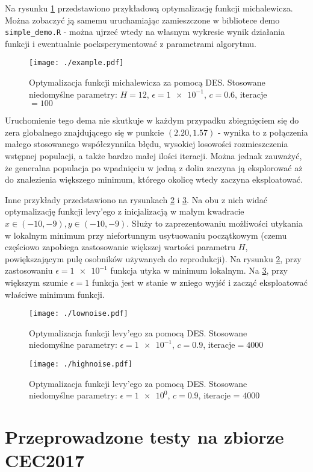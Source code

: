 Na rysunku \ref{R1} przedstawiono przykładową optymalizację funkcji michalewicza. Można zobaczyć ją samemu uruchamiając zamieszczone w bibliotece demo \verb|simple_demo.R| - można ujrzeć wtedy na własnym  wykresie wynik działania funkcji i ewentualnie poeksperymentować z parametrami algorytmu.

\begin{figure}
\texttt{[image: ./example.pdf]}
\caption{Optymalizacja funkcji michalewicza za pomocą DES. Stosowane niedomyślne parametry: $ H = 12 $, $ \epsilon = \num{1e-1} $, $ c = 0.6 $, iteracje$ =100 $}
\label{R1}
\end{figure}

Uruchomienie tego dema nie skutkuje w każdym przypadku zbiegnięciem się do zera globalnego znajdującego się w punkcie $ (2.20,1.57) $ - wynika to z połączenia małego stosowanego współczynnika błędu, wysokiej losowości rozmieszczenia wstępnej populacji, a także bardzo małej ilości iteracji. Można jednak zauważyć, że generalna populacja po wpadnięciu w jedną z dolin zaczyna ją eksplorować aż do znalezienia większego minimum, którego okolicę wtedy zaczyna eksploatować.

Inne przykłady przedstawiono na rysunkach \ref{R2} i \ref{R3}. Na obu z nich widać optymalizację funkcji levy'ego z inicjalizacją w małym kwadracie $ x \in (-10,-9), y\in (-10,-9) $. Służy to zaprezentowaniu możliwości utykania w lokalnym minimum przy niefortunnym usytuowaniu początkowym (czemu częściowo zapobiega zastosowanie większej wartości parametru $ H $, powiększającym pulę osobników używanych do reprodukcji). Na rysunku \ref{R2}, przy zastosowaniu $ \epsilon = \num{1e-1} $ funkcja utyka w minimum lokalnym. Na \ref{R3}, przy większym szumie $ \epsilon = \num{1} $ funkcja jest w stanie w zniego wyjść i zacząć eksploatować właściwe minimum funkcji.
 
\begin{figure}
	\texttt{[image: ./lownoise.pdf]}
	\caption{Optymalizacja funkcji levy'ego za pomocą DES. Stosowane niedomyślne parametry: $ \epsilon = \num{1e-1} $, $ c = 0.9 $, iteracje$ =4000 $}
	\label{R2}
\end{figure}


\begin{figure}
	\texttt{[image: ./highnoise.pdf]}
	\caption{Optymalizacja funkcji levy'ego za pomocą DES. Stosowane niedomyślne parametry: $ \epsilon = \num{1e0} $, $ c = 0.9 $, iteracje = $4000 $}
	\label{R3}
\end{figure}

\section{Przeprowadzone testy na zbiorze CEC2017}


